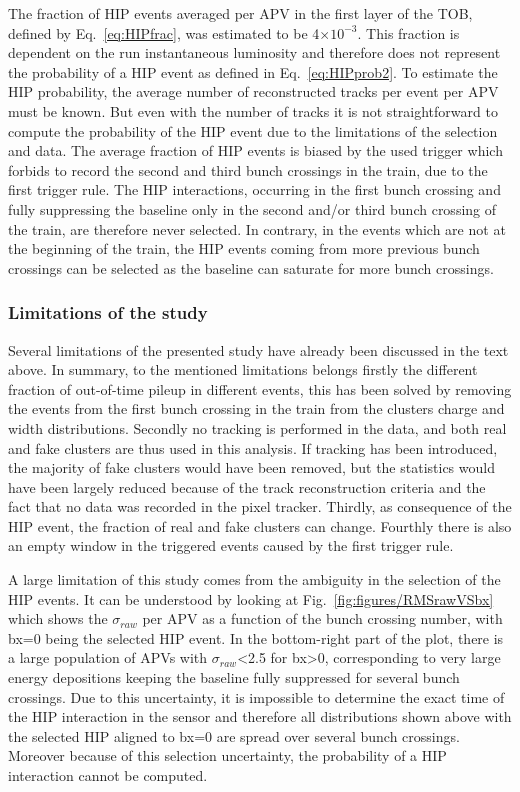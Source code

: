 The fraction of HIP events averaged per APV in the first layer of the TOB, defined by Eq.~\ref{eq:HIPfrac}, was estimated to be 4$\times 10^{-3}$. This fraction is dependent on the run instantaneous luminosity and therefore does not represent the probability of a HIP event as defined in Eq.~\ref{eq:HIPprob2}. To estimate the HIP probability, the average number of reconstructed tracks per event per APV must be known. But even with the number of tracks it is not straightforward to compute the probability of the HIP event due to the limitations of the selection and data. The average fraction of HIP events is biased by the used trigger which forbids to record the second and third bunch crossings in the train, due to the first trigger rule. The HIP interactions, occurring in the first bunch crossing and fully suppressing the baseline only in the second and/or third bunch crossing of the train, are therefore never selected. In contrary, in the events which are not at the beginning of the train, the HIP events coming from more previous bunch crossings can be selected as the baseline can saturate for more bunch crossings.
 

\subsubsection{Limitations of the study~\label{sec:limitationsSelection}}
Several limitations of the presented study have already been discussed in the text above. In summary, to the mentioned limitations belongs firstly the different fraction of out-of-time pileup in different events, this has been solved by removing the events from the first bunch crossing in the train from the clusters charge and width distributions. Secondly no tracking is performed in the data, and both real and fake clusters are thus used in this analysis. If tracking has been introduced, the majority of fake clusters would have  been removed, but the statistics would have been largely reduced because of the track reconstruction criteria and the fact that no data was recorded in the pixel tracker. Thirdly, as consequence of the HIP event, the fraction of real and fake clusters can change. Fourthly there is also an empty window in the triggered events caused by the first trigger rule.

A large limitation of this study comes from the ambiguity in the selection of the HIP events. It can be understood by looking at Fig.~\ref{fig:figures/RMSrawVSbx} which shows the $\sigma_{raw}$ per APV as a function of the bunch crossing number, with bx=0 being the selected HIP event. In the bottom-right part of the plot, there is a large population of APVs with $\sigma_{raw}$<2.5 for bx>0, corresponding to very large energy depositions keeping the baseline fully suppressed for several bunch crossings. Due to this uncertainty, it is impossible to determine the exact time of the HIP interaction in the sensor and therefore all distributions shown above with the selected HIP aligned to bx=0 are spread over several bunch crossings. Moreover because of this selection uncertainty, the probability of a HIP interaction cannot be computed. 

